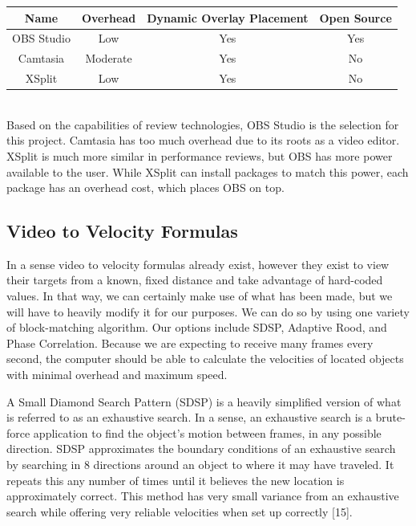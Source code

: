 \documentclass[onecolumn, draftclsnofoot,10pt, compsoc]{IEEEtran}
\begin{document}
\begin{tabular}{|c|c|c|c|}
  \hline
  \textbf{Name} & \textbf{Overhead} & \textbf{Dynamic Overlay Placement} & \textbf{Open Source} \\
  \hline
  OBS Studio & Low & Yes & Yes \\ 
  \hline
  Camtasia & Moderate & Yes & No  \\ 
  \hline
  XSplit & Low & Yes & No \\ 
  \hline
\end{tabular} \\

Based on the capabilities of review technologies, OBS Studio is the selection for this project.  Camtasia has too much overhead due to its roots as a video editor.  XSplit is much more similar in performance reviews, but OBS has more power available to the user.  While XSplit can install packages to match this power, each package has an overhead cost, which places OBS on top.

\newpage
\subsection{Video to Velocity Formulas} %

In a sense video to velocity formulas already exist, however they exist to view their targets from a known, fixed distance and take advantage of hard-coded values.  In that way, we can certainly make use of what has been made, but we will have to heavily modify it for our purposes.  We can do so by using one variety of block-matching algorithm.  Our options include SDSP, Adaptive Rood, and Phase Correlation.  Because we are expecting to receive many frames every second, the computer should be able to calculate the velocities of located objects with minimal overhead and maximum speed.

A Small Diamond Search Pattern (SDSP) is a heavily simplified version of what is referred to as an exhaustive search.  In a sense, an exhaustive search is a brute-force application to find the object's motion between frames, in any possible direction.  SDSP approximates the boundary conditions of an exhaustive search by searching in 8 directions around an object to where it may have traveled.  It repeats this any number of times until it believes the new location is approximately correct.  This method has very small variance from an exhaustive search while offering very reliable velocities when set up correctly [15].
\end{document}
